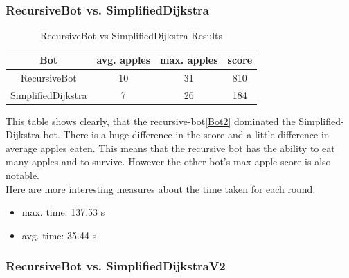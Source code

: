 \documentclass[a4paper,12pt]{article}
\begin{document}
\subsubsection{RecursiveBot vs. SimplifiedDijkstra}
\begin{table}[ht]
\caption{RecursiveBot vs SimplifiedDijkstra Results} %
\centering %
\begin{tabular}{c c c c } %
\hline\hline %
Bot & avg. apples & max. apples & score\\ [0.5ex] %
\hline %
RecursiveBot & 10 & 31 & 810 \\ %
SimplifiedDijkstra & 7 & 26 & 184 \\
[1ex] %
\hline %
\end{tabular}
\label{table:recvsdijkstra} %
\end{table}
This table shows clearly, that the recursive-bot\ref{Bot2} dominated the Simplified-Dijkstra bot. There is a huge difference in the score and a little difference in average apples eaten. This means that the recursive bot has the ability to eat many apples and to survive. However the other bot's max apple score is also notable.\\
Here are more interesting measures about the time taken for each round:\\
\begin{itemize}
	\item max. time: 137.53 s
	\item avg. time:  35.44 s
\end{itemize}
\subsubsection{RecursiveBot vs. SimplifiedDijkstraV2}
\end{document}
